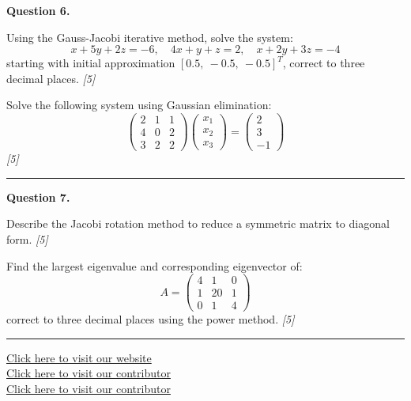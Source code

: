 \documentclass[11pt,a4paper]{article}
\newcommand{\pts}[1]{\hfill   \textit{[#1]}}
\begin{document}
\medskip


\noindent   \textbf{Question 6.}

\begin{parts}
  \item Using the Gauss-Jacobi iterative method, solve the system:
  \[
  x + 5y + 2z = -6,\quad 4x + y + z = 2,\quad x + 2y + 3z = -4
  \]
  starting with initial approximation $[0.5,\ -0.5,\ -0.5]^T$, correct to three decimal places. \pts{5}
  \item Solve the following system using Gaussian elimination:
  \[
  
\begin{pmatrix}2 & 1 & 1 \\ 4 & 0 & 2 \\ 3 & 2 & 2\end{pmatrix}
  
\begin{pmatrix}x_1\\x_2\\x_3\end{pmatrix}
  =
  
\begin{pmatrix}2\\3\\-1\end{pmatrix}
  \] \pts{5}
\end{parts}

\medskip\rule{\linewidth}{0.2pt}

\medskip


\noindent   \textbf{Question 7.}

\begin{parts}
  \item Describe the Jacobi rotation method to reduce a symmetric matrix to diagonal form. \pts{5}
  \item Find the largest eigenvalue and corresponding eigenvector of:
  \[
  A = 
\begin{pmatrix}4 & 1 & 0 \\ 1 & 20 & 1 \\ 0 & 1 & 4\end{pmatrix}
  \]
  correct to three decimal places using the power method. \pts{5}
\end{parts}

\vfill\rule{\linewidth}{0.4pt}

\begin{center}\small
  \href{https://bhu-exam.vercel.app/}{Click here to visit our website}\\[4pt]
  \href{https://me-aryan.vercel.app/}{Click here to visit our contributor}\\[4pt]
  \href{https://quashan-me.vercel.app/}{Click here to visit our contributor}
\end{center}
\end{document}
